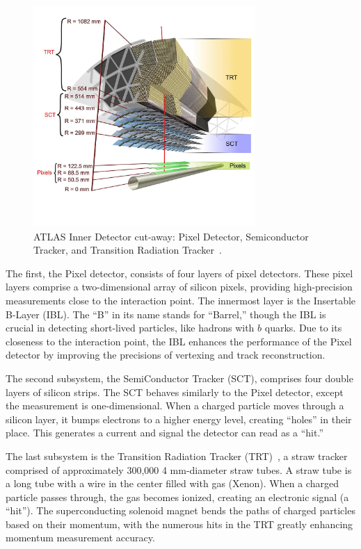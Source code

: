 \begin{figure}[ht]
    \centering
    \includegraphics[width=0.75\textwidth]{figures/LHC/id_layout.jpg}
    \caption[]{ATLAS Inner Detector cut-away: Pixel Detector, Semiconductor Tracker, and Transition Radiation Tracker~\cite{Pequenao:1095926}.}
    \label{fig:id_layout}
\end{figure}

The first, the Pixel detector, consists of four layers of pixel detectors.
These pixel layers comprise a two-dimensional array of silicon pixels, providing high-precision measurements close to the interaction point.
The innermost layer is the Insertable B-Layer (IBL). The ``B'' in its name stands for ``Barrel,'' though the IBL is crucial in detecting short-lived particles, like hadrons with $b$ quarks. Due to its closeness to the interaction point, the IBL enhances the performance of the Pixel detector by improving the precisions of vertexing and track reconstruction.

The second subsystem, the SemiConductor Tracker (SCT), comprises four double layers of silicon strips. The SCT behaves similarly to the Pixel detector, except the measurement is one-dimensional. 
When a charged particle moves through a silicon layer, it bumps electrons to a higher energy level, creating ``holes'' in their place. This generates a current and signal the detector can read as a ``hit.''

The last subsystem is the Transition Radiation Tracker (TRT)~\cite{TheATLASTRTcollaboration_2008}, a straw tracker comprised of approximately 300,000 4 mm-diameter straw tubes. 
A straw tube is a long tube with a wire in the center filled with gas (Xenon). When a charged particle passes through, the gas becomes ionized, creating an electronic signal (a ``hit'').
The superconducting solenoid magnet bends the paths of charged particles based on their momentum, with the numerous hits in the TRT greatly enhancing momentum measurement accuracy.

